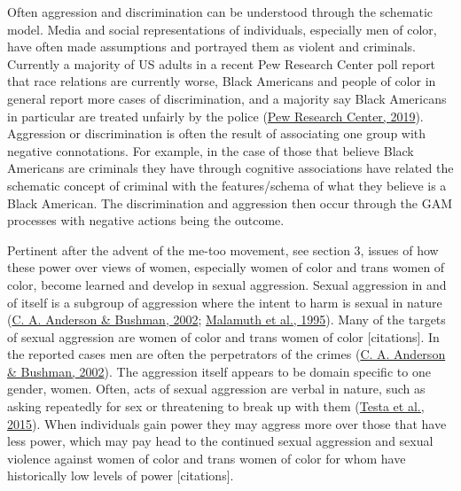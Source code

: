 \documentclass[
  donotrepeattitle,doc, 12pt, a4paper,floatsintext]{apa7}
\begin{document}
Often aggression and discrimination can be understood through the schematic model. Media and social representations of individuals, especially men of color, have often made assumptions and portrayed them as violent and criminals. Currently a majority of US adults in a recent Pew Research Center poll report that race relations are currently worse, Black Americans and people of color in general report more cases of discrimination, and a majority say Black Americans in particular are treated unfairly by the police (\protect\hyperlink{ref-pewresearchcenter2019}{Pew Research Center, 2019}). Aggression or discrimination is often the result of associating one group with negative connotations. For example, in the case of those that believe Black Americans are criminals they have through cognitive associations have related the schematic concept of criminal with the features/schema of what they believe is a Black American. The discrimination and aggression then occur through the GAM processes with negative actions being the outcome.

Pertinent after the advent of the me-too movement, see section 3, issues of how these power over views of women, especially women of color and trans women of color, become learned and develop in sexual aggression. Sexual aggression in and of itself is a subgroup of aggression where the intent to harm is sexual in nature (\protect\hyperlink{ref-anderson2002}{C. A. Anderson \& Bushman, 2002}; \protect\hyperlink{ref-malamuth1995}{Malamuth et al., 1995}). Many of the targets of sexual aggression are women of color and trans women of color {[}citations{]}. In the reported cases men are often the perpetrators of the crimes (\protect\hyperlink{ref-anderson2002}{C. A. Anderson \& Bushman, 2002}). The aggression itself appears to be domain specific to one gender, women. Often, acts of sexual aggression are verbal in nature, such as asking repeatedly for sex or threatening to break up with them (\protect\hyperlink{ref-testa2015}{Testa et al., 2015}). When individuals gain power they may aggress more over those that have less power, which may pay head to the continued sexual aggression and sexual violence against women of color and trans women of color for whom have historically low levels of power {[}citations{]}.
\end{document}
